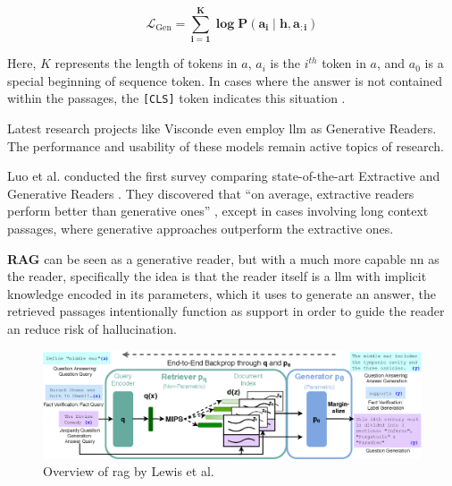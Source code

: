 \begin{equation}
    \mathbf{\mathcal{L}_{\mathrm{Gen}}=\sum_{i=1}^K \log \mathbf{P}\left(a_i \mid \mathbf{h}, a_{: i}\right)}
\end{equation}

Here, $K$ represents the length of tokens in $a$, $a_i$ is the $i^{th}$ token in $a$, and $a_0$ is a special beginning of sequence token. In cases where the answer is not contained within the passages, the \verb|[CLS]| token indicates this situation \cite{luo_choose_2022,zhu_retrieving_2021}.

Latest research projects like Visconde \cite{pereira_visconde_2022} even employ \gls{llm} as Generative Readers. The performance and usability of these models remain active topics of research.

Luo et al. conducted the first survey comparing state-of-the-art Extractive and Generative Readers \cite{luo_choose_2022}. They discovered that \enquote{on average, extractive readers perform better than generative ones} \cite{luo_choose_2022}, except in cases involving long context passages, where generative approaches outperform the extractive ones.

\textbf{RAG} can be seen as a generative reader, but with a much more capable \gls{nn} as the reader, specifically the idea is that the reader itself is a \gls{llm} with implicit knowledge encoded in its parameters, which it uses to generate an answer, the retrieved passages intentionally function as support in order to guide the reader an reduce risk of hallucination. 

\begin{figure}
    \centering
    \includegraphics[width=\textwidth]{Grafiken/RAG-Figure1.png}
    \caption{Overview of \gls{rag} by Lewis et al. \cite{lewis_retrieval-augmented_2021}}
    \label{fig:rag}
\end{figure}

